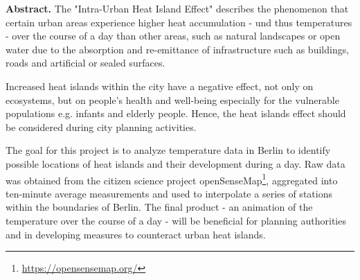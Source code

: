 
\noindent\textbf{Abstract.} The "Intra-Urban Heat Island Effect" describes the phenomenon that certain urban areas experience higher heat accumulation - und thus temperatures - over the course of a day than other areas, such as natural landscapes or open water due to the absorption and re-emittance of infrastructure such as buildings, roads and artificial or sealed surfaces.

Increased heat islands within the city have a negative effect, not only on ecosystems, but on people’s health and well-being especially for the vulnerable populations e.g. infants and elderly people. Hence, the heat islands effect should be considered during city planning activities.

The goal for this project is to analyze temperature data in Berlin to identify possible locations of heat islands and their development during a day. Raw data was obtained from the citizen science project openSenseMap\footnote{\url{https://opensensemap.org/}}, aggregated into ten-minute average measurements and used to interpolate a series of stations within the boundaries of Berlin. The final product - an animation of the temperature over the course of a day - will be beneficial for planning authorities and in developing measures to counteract urban heat islands.
